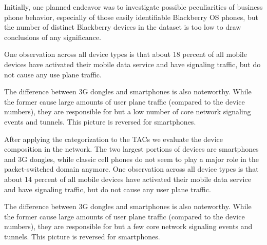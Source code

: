 

Initially, one planned endeavor was to investigate possible peculiarities of business phone behavior, especially of those easily identifiable Blackberry OS phones, but the number of distinct Blackberry devices in the dataset is too low to draw conclusions of any significance.

One observation across all device types is that about 18 percent of all mobile devices have activated their mobile data service and have signaling traffic, but do not cause any use plane traffic.

The difference between 3G dongles and smartphones is also noteworthy. While the former cause large amounts of user plane traffic (compared to the device numbers), they are responsible for but a low number of core network signaling events and tunnels. This picture is reversed for smartphones.

After applying the categorization to the \glspl{TAC} we evaluate the device composition in the network. The two largest portions of devices are smartphones and 3G dongles, while classic cell phones do not seem to play a major role in the packet-switched domain anymore. One observation across all device types is that about 14 percent of all mobile devices have activated their mobile data service and have signaling traffic, but do not cause any user plane traffic.

The difference between 3G dongles and smartphones is also noteworthy. While the former cause large amounts of user plane traffic (compared to the device numbers), they are responsible for but a few core network signaling events and tunnels. This picture is reversed for smartphones.





